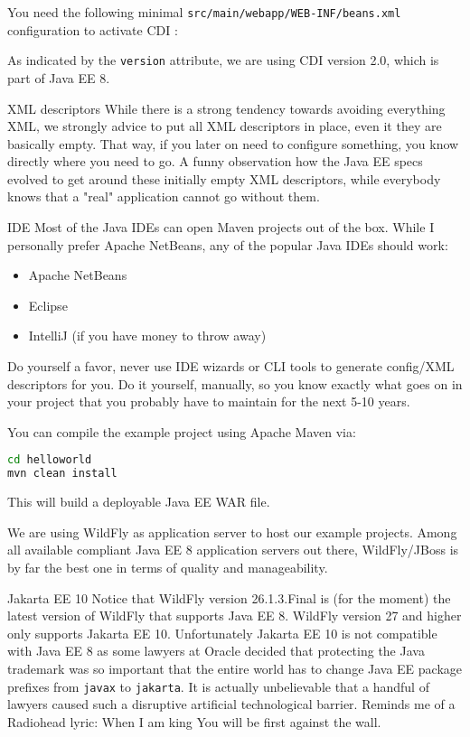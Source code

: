 You need the following minimal \texttt{src/main/webapp/WEB-INF/beans.xml} configuration to activate CDI \cite{CDI2}:

As indicated by the \texttt{version} attribute, we are using CDI version 2.0, which is part of Java EE 8.
\begin{TIP}{XML descriptors}
While there is a strong tendency towards avoiding everything XML,
we strongly advice to put all XML descriptors in place,
even it they are basically empty.
That way, if you later on need to configure something,
you know directly where you need  to go.
A  funny observation how  the Java EE specs evolved to get around these initially empty XML descriptors,
while everybody knows that a  "real" application cannot go without them.
\end{TIP}

\begin{TIP}{IDE}
Most of the Java IDEs can open Maven projects out of the box.
While I personally prefer Apache NetBeans,
any of the popular Java IDEs should work:
\begin{itemize}
	\item Apache NetBeans
	\item Eclipse
	\item IntelliJ (if you have money to throw away)
\end{itemize}
Do yourself a favor,
never use IDE wizards or CLI tools to generate config/XML descriptors for you.
Do it yourself, manually, so you know exactly what goes on in your project that you probably have to maintain for the next 5-10 years.
\end{TIP}

You can compile the example project using Apache Maven via:
\begin{lstlisting}[language=bash]
cd helloworld
mvn clean install
\end{lstlisting}
This will build a deployable Java EE WAR file.

We are using WildFly \cite{WildFly} as application server to host our example projects.
Among all available compliant Java EE 8 application servers out there,
WildFly/JBoss is by far the best one in terms of quality and manageability.

\begin{ClownComputing}{Jakarta EE 10}
	Notice that WildFly version 26.1.3.Final is (for the moment) the latest version of WildFly that supports Java EE 8.
	WildFly version 27 and higher only supports Jakarta EE 10.
	Unfortunately Jakarta EE 10 is not compatible with Java EE 8 as some lawyers at Oracle decided that protecting the Java trademark was so important that the entire world has to change Java EE package prefixes from \texttt{javax} to \texttt{jakarta}.
	It is actually unbelievable that a handful of lawyers caused such a disruptive artificial technological barrier.
	Reminds me of a Radiohead lyric: When I am king
	You will be first against the wall.
\end{ClownComputing}

